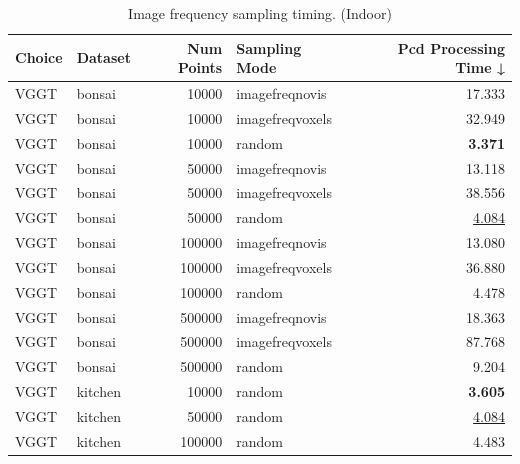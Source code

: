\begin{table}[H]
\caption{\ifdefined\customcaption \customcaption \else Image frequency sampling timing. (Indoor) \fi}
\label{tab:03_sampling_mode_single_timing_indoor}
\centering
\scriptsize
\begin{tabular}{llrlr}
\toprule
Choice & Dataset & Num Points & Sampling Mode & Pcd Processing Time ↓ \\
\midrule
VGGT & bonsai & 10000 & imagefreqnovis & 17.333 \\
VGGT & bonsai & 10000 & imagefreqvoxels & 32.949 \\
VGGT & bonsai & 10000 & random & \textbf{3.371} \\
VGGT & bonsai & 50000 & imagefreqnovis & 13.118 \\
VGGT & bonsai & 50000 & imagefreqvoxels & 38.556 \\
VGGT & bonsai & 50000 & random & \underline{4.084} \\
VGGT & bonsai & 100000 & imagefreqnovis & 13.080 \\
VGGT & bonsai & 100000 & imagefreqvoxels & 36.880 \\
VGGT & bonsai & 100000 & random & 4.478 \\
VGGT & bonsai & 500000 & imagefreqnovis & 18.363 \\
VGGT & bonsai & 500000 & imagefreqvoxels & 87.768 \\
VGGT & bonsai & 500000 & random & 9.204 \\
\midrule
VGGT & kitchen & 10000 & random & \textbf{3.605} \\
VGGT & kitchen & 50000 & random & \underline{4.084} \\
VGGT & kitchen & 100000 & random & 4.483 \\
\bottomrule
\end{tabular}
\end{table}